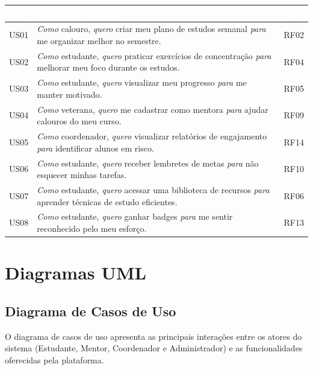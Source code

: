 \documentclass[12pt, a4paper]{article}
\begin{document}
\begin{center}
\begin{tabularx}{\textwidth}{|c|X|c|}
\hline
\rowcolor{faesaAzul}
\textcolor{white}{\textbf{ID}} & \textcolor{white}{\textbf{História de Usuário}} & \textcolor{white}{\textbf{RF}} \\
\hline
US01 & \textit{Como} calouro, \textit{quero} criar meu plano de estudos semanal \textit{para} me organizar melhor no semestre. & RF02 \\
\hline
US02 & \textit{Como} estudante, \textit{quero} praticar exercícios de concentração \textit{para} melhorar meu foco durante os estudos. & RF04 \\
\hline
US03 & \textit{Como} estudante, \textit{quero} visualizar meu progresso \textit{para} me manter motivado. & RF05 \\
\hline
US04 & \textit{Como} veterana, \textit{quero} me cadastrar como mentora \textit{para} ajudar calouros do meu curso. & RF09 \\
\hline
US05 & \textit{Como} coordenador, \textit{quero} visualizar relatórios de engajamento \textit{para} identificar alunos em risco. & RF14 \\
\hline
US06 & \textit{Como} estudante, \textit{quero} receber lembretes de metas \textit{para} não esquecer minhas tarefas. & RF10 \\
\hline
US07 & \textit{Como} estudante, \textit{quero} acessar uma biblioteca de recursos \textit{para} aprender técnicas de estudo eficientes. & RF06 \\
\hline
US08 & \textit{Como} estudante, \textit{quero} ganhar badges \textit{para} me sentir reconhecido pelo meu esforço. & RF13 \\
\hline
\end{tabularx}
\end{center}

\newpage
\section{Diagramas UML}

\subsection{Diagrama de Casos de Uso}

O diagrama de casos de uso apresenta as principais interações entre os atores do sistema (Estudante, Mentor, Coordenador e Administrador) e as funcionalidades oferecidas pela plataforma.
\end{document}
